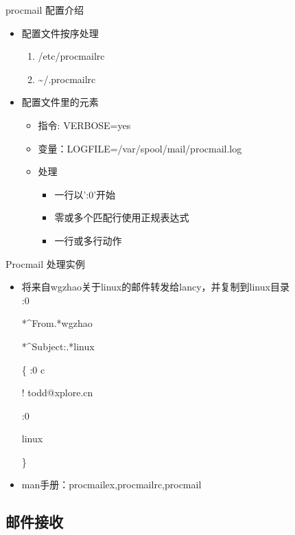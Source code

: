 \begin{frame}{procmail 配置介绍}
\begin{itemize}
\item 配置文件按序处理

\begin{enumerate}
\item /etc/procmailrc
\item \textasciitilde{}/.procmailrc
\end{enumerate}
\item 配置文件里的元素

\begin{itemize}
\item 指令: VERBOSE=yes
\item 变量：LOGFILE=/var/spool/mail/procmail.log
\item 处理

\begin{itemize}
\item 一行以':0'开始
\item 零或多个匹配行使用正规表达式
\item 一行或多行动作
\end{itemize}
\end{itemize}
\end{itemize}

\end{frame} 
\begin{frame}{Procmail 处理实例}
\begin{itemize}
\item 将来自wgzhao关于linux的邮件转发给lancy，并复制到linux目录\\
:0


{*}\textasciicircum{}From.{*}wgzhao


{*}\textasciicircum{}Subject:.{*}linux


\{ :0 c


! todd@xplore.cn


:0


linux


\}

\item man手册：procmailex,procmailrc,procmail
\end{itemize}

\end{frame} 
\subsection{邮件接收}


